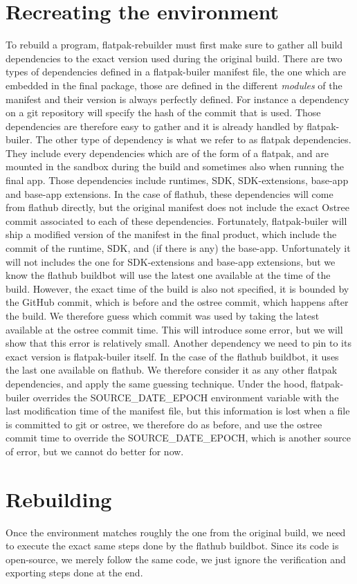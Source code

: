 \documentclass[a4paper,11pt,oneside]{report}
\theoremstyle{definition}
\newcommand{\sysname}{flatpak-rebuilder\xspace}
\newcommand{\fp}{flatpak\xspace}
\newcommand{\fh}{flathub\xspace}
\newcommand{\fb}{flatpak-builer\xspace}
\newcommand{\fdp}{flatpak dependencies\xspace}
\newcommand{\sde}{SOURCE\_DATE\_EPOCH\xspace}
\newcommand{\fhbb}{flathub buildbot\xspace}
\begin{document}
\section{Recreating the environment}
To rebuild a program, \sysname must first make sure to gather all build
dependencies to the exact version used during the original build. There are two
types of dependencies defined in a \fb manifest file, the one which are
embedded in the final package, those are defined in the different
\emph{modules} of the manifest and their version is always perfectly defined.
For instance a dependency on a git repository will specify the hash of the
commit that is used. Those dependencies are therefore easy to gather and it is
already handled by \fb.
The other type of dependency is what we refer to as \fdp. They include every
dependencies which are of the form of a \fp, and are mounted in the sandbox
during the build and sometimes also when running the final app. Those
dependencies include runtimes, SDK, SDK-extensions, base-app and base-app
extensions. In the case of \fh, these dependencies will come from \fh directly,
but the original manifest does not include the exact Ostree commit associated
to each of these dependencies. Fortunately, \fb will ship a modified version of
the manifest in the final product, which include the commit of the runtime,
SDK, and (if there is any) the base-app. Unfortunately it will not includes the
one for SDK-extensions and base-app extensions, but we know the \fhbb will use
the latest one available at the time of the build. However, the exact time of
the build is also not specified, it is bounded by the GitHub commit, which is
before and the ostree commit, which happens after the build. We therefore guess
which commit was used by taking the latest available at the ostree commit time.
This will introduce some error, but we will show that this error is relatively
small. Another dependency we need to pin to its exact version is \fb itself. In
the case of the \fhbb, it uses the last one available on \fh. We therefore
consider it as any other \fdp, and apply the same guessing technique.
Under the hood, \fb overrides the \sde environment variable with the last
modification time of the manifest file, but this information is lost when a
file is committed to git or ostree, we therefore do as before, and use the
ostree commit time to override the \sde, which is another source of error, but
we cannot do better for now.

\section{Rebuilding}
Once the environment matches roughly the one from the original build, we need
to execute the exact same steps done by the \fhbb. Since its code is
open-source, we merely follow the same code, we just ignore the verification
and exporting steps done at the end.
\end{document}
